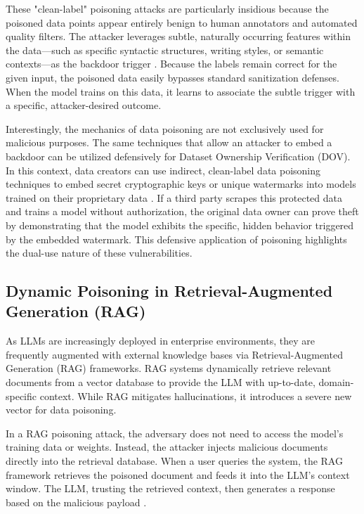 \documentclass[11pt,a4paper]{article}
\begin{document}
These "clean-label" poisoning attacks are particularly insidious because the poisoned data points appear entirely benign to human annotators and automated quality filters. The attacker leverages subtle, naturally occurring features within the data---such as specific syntactic structures, writing styles, or semantic contexts---as the backdoor trigger \cite{Song_2024_Claim, Xing_2023_Clean}. Because the labels remain correct for the given input, the poisoned data easily bypasses standard sanitization defenses. When the model trains on this data, it learns to associate the subtle trigger with a specific, attacker-desired outcome. 

Interestingly, the mechanics of data poisoning are not exclusively used for malicious purposes. The same techniques that allow an attacker to embed a backdoor can be utilized defensively for Dataset Ownership Verification (DOV). In this context, data creators can use indirect, clean-label data poisoning techniques to embed secret cryptographic keys or unique watermarks into models trained on their proprietary data \cite{Bouaziz_2024_Data, Bouaziz_2025_Winter}. If a third party scrapes this protected data and trains a model without authorization, the original data owner can prove theft by demonstrating that the model exhibits the specific, hidden behavior triggered by the embedded watermark. This defensive application of poisoning highlights the dual-use nature of these vulnerabilities.

\subsection{Dynamic Poisoning in Retrieval-Augmented Generation (RAG)}

As LLMs are increasingly deployed in enterprise environments, they are frequently augmented with external knowledge bases via Retrieval-Augmented Generation (RAG) frameworks. RAG systems dynamically retrieve relevant documents from a vector database to provide the LLM with up-to-date, domain-specific context. While RAG mitigates hallucinations, it introduces a severe new vector for data poisoning.

In a RAG poisoning attack, the adversary does not need to access the model's training data or weights. Instead, the attacker injects malicious documents directly into the retrieval database. When a user queries the system, the RAG framework retrieves the poisoned document and feeds it into the LLM's context window. The LLM, trusting the retrieved context, then generates a response based on the malicious payload \cite{Wang_2024_LLMs}. 
\end{document}
